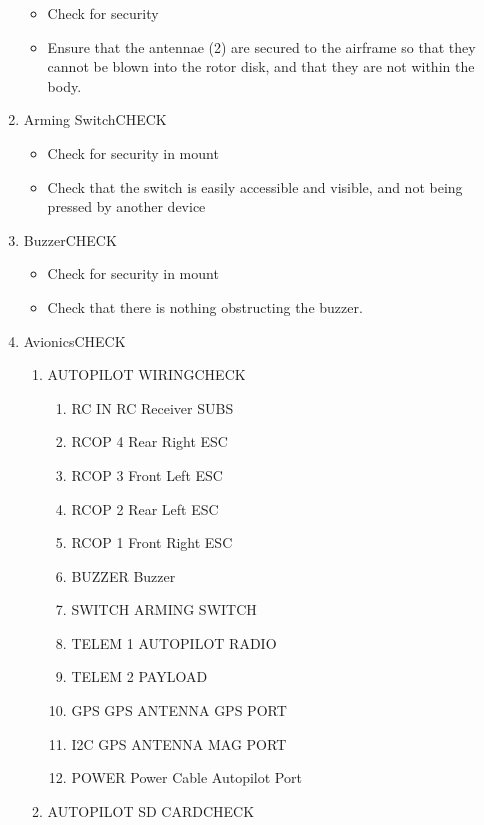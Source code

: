 \documentclass{report}
\begin{document}
\begin{enumerate}
				\begin{itemize}
					\item Check for security
					\item Ensure that the antennae (2) are secured to the airframe so that they cannot be blown into the rotor disk, and that they are not within the body.
				\end{itemize}
			\item Arming Switch\hrulefill CHECK
				\begin{itemize}
					\item Check for security in mount
					\item Check that the switch is easily accessible and visible, and not being pressed by another device
				\end{itemize}
			\item Buzzer\hrulefill CHECK
				\begin{itemize}
					\item Check for security in mount
					\item Check that there is nothing obstructing the buzzer.
				\end{itemize}
			\item Avionics\hrulefill CHECK
				\begin{enumerate}
					\item AUTOPILOT WIRING\hrulefill CHECK
						\begin{enumerate}
							\item RC IN \dotfill RC Receiver SUBS
							\item RCOP 4 \dotfill Rear Right ESC
							\item RCOP 3 \dotfill Front Left ESC
							\item RCOP 2 \dotfill Rear Left ESC
							\item RCOP 1 \dotfill Front Right ESC
							\item BUZZER \dotfill Buzzer
							\item SWITCH \dotfill ARMING SWITCH
							\item TELEM 1 \dotfill AUTOPILOT RADIO
							\item TELEM 2 \dotfill PAYLOAD
							\item GPS \dotfill GPS ANTENNA GPS PORT
							\item I2C \dotfill GPS ANTENNA MAG PORT
							\item POWER \dotfill Power Cable Autopilot Port
						\end{enumerate}
					\item AUTOPILOT SD CARD\hrulefill CHECK

\end{enumerate}
\end{enumerate}
\end{document}
